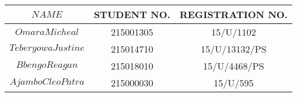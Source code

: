 \documentclass{article}
\begin{document}
\begin{tabular}{|c|c|c|}
	
	
\hline	$NAME$ & STUDENT NO. & REGISTRATION NO. \\ \hline
\hline	$Omara Micheal$ & 215001305 &15/U/1102 \\ \hline
\hline	$Teberyowa Justine$ &215014710 & 15/U/13132/PS \\ \hline
\hline	$Bbengo Reagan$ & 215018010 & 15/U/4468/PS \\ \hline
\hline	$Ajambo Cleo Patra$ & 215000030 & 15/U/595 \\ \hline
	
	
\end{tabular}
\end{document}
